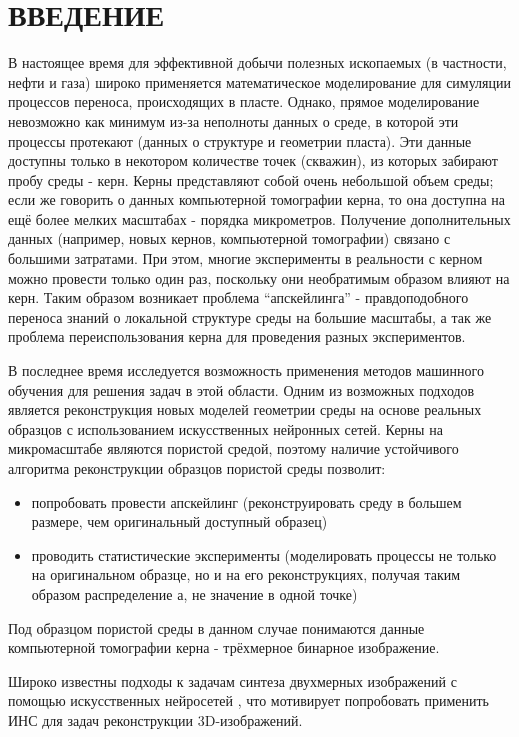 \clearpage
\section*{\hfil ВВЕДЕНИЕ \hfil}
	
	В настоящее время для эффективной добычи полезных ископаемых (в частности, нефти и газа) широко применяется математическое моделирование для симуляции процессов переноса, происходящих в пласте. Однако, прямое моделирование невозможно как минимум из-за неполноты данных о среде, в которой эти процессы протекают (данных о структуре и геометрии пласта). Эти данные доступны только в некотором количестве точек (скважин), из которых забирают пробу среды - керн. Керны представляют собой очень небольшой объем среды; если же говорить о данных компьютерной томографии керна, то она доступна на ещё более мелких масштабах - порядка микрометров. Получение дополнительных данных (например, новых кернов, компьютерной томографии) связано с большими затратами. При этом, многие эксперименты в реальности с керном можно провести только один раз, поскольку они необратимым образом влияют на керн. Таким образом возникает проблема ``апскейлинга'' - правдоподобного переноса знаний о локальной структуре среды на большие масштабы, а так же проблема переиспользования керна для проведения разных экспериментов.
	
	В последнее время исследуется возможность применения методов машинного обучения для решения задач в этой области. Одним из возможных подходов является реконструкция новых моделей геометрии среды на основе реальных образцов с использованием искусственных нейронных сетей. Керны на микромасштабе являются пористой средой, поэтому наличие устойчивого алгоритма реконструкции образцов пористой среды позволит:
	
	\begin{itemize}
		\item попробовать провести апскейлинг (реконструировать среду в большем размере, чем оригинальный доступный образец)
		\item проводить статистические эксперименты (моделировать процессы не только на оригинальном образце, но и на его реконструкциях, получая таким образом распределение а, не значение в одной точке)
	\end{itemize}

	
	Под образцом пористой среды в данном случае понимаются данные компьютерной томографии керна - трёхмерное бинарное изображение.
	
	Широко известны подходы к задачам синтеза двухмерных изображений с помощью искусственных нейросетей \cite{texture-synthesis-using-CNN, texture-networks}, что мотивирует попробовать применить ИНС для задач реконструкции 3D-изображений.
	
